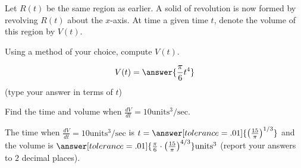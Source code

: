 \documentclass{ximera}
\author{Jim Talamo}
\begin{document}
\begin{exercise}
Let $R(t)$ be the same region as earlier.  A solid of revolution is now formed by revolving $R(t)$ about the $x$-axis.  At time a given time $t$, denote the volume of this region by $V(t)$.

Using a method of your choice, compute $V(t)$.

\[
V(t) = \answer{\frac{\pi}{6}t^4}
\]
(type your answer in terms of $t$)

\begin{exercise}
Find the time and volume when $\frac{dV}{dt} = 10 \mathrm{units^3/sec}$.

The time when $\frac{dV}{dt} = 10 \mathrm{units^3/sec}$ is $t= \answer[tolerance=.01]{\left(\frac{15}{\pi}\right)^{1/3}}$ and the volume is $\answer[tolerance=.01]{\frac{\pi}{6} \cdot \left(\frac{15}{\pi}\right)^{4/3} } \mathrm{units^3}$  (report your answers to $2$ decimal places). 

\end{exercise}

\end{exercise}
\end{document}
